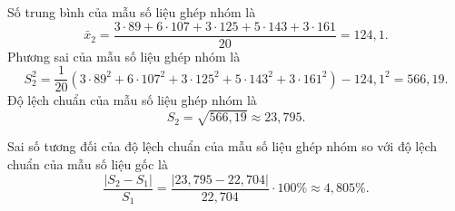 \begin{vd}
{\begin{enumEX}{1}
\begin{center}
\begin{tabular}{|c|c|c|c|c|c|}
				\end{tabular}
			\end{center}
			Số trung bình của mẫu số liệu ghép nhóm là
			$$\bar{x}_2=\dfrac{3\cdot 89+6\cdot 107+3\cdot 125+5\cdot 143+3\cdot 161}{20}=124,1.$$
			Phương sai của mẫu số liệu ghép nhóm là
			$$S_2^2=\dfrac{1}{20}\left(3\cdot 89^2+6\cdot 107^2+3\cdot 125^2+5\cdot 143^2+3\cdot 161^2\right)-124,1^2=566,19.$$
			Độ lệch chuẩn của mẫu số liệu ghép nhóm là
			$$S_2=\sqrt{566,19} \approx 23,795.$$
			\item Sai số tương đối của độ lệch chuẩn của mẫu số liệu ghép nhóm so với độ lệch chuẩn của mẫu số liệu gốc là
			$$\dfrac{\left|S_2-S_1\right|}{S_1}=\dfrac{|23,795-22,704|}{22,704} \cdot 100 \% \approx 4,805 \%.$$
		\end{enumEX}
	}
\end{vd}
